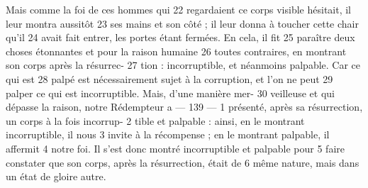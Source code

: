Mais comme la foi de ces hommes qui	 
22	 	regardaient ce corps visible hésitait, il leur montra aussitôt	 
23	 	ses mains et son côté ; il leur donna à toucher cette chair qu'il	 
24	 	avait fait entrer, les portes étant fermées. En cela, il fit	 
25	 	paraître deux choses étonnantes et pour la raison humaine	 
26	 	toutes contraires, en montrant son corps après la résurrec-	 
27	 	tion : incorruptible, et néanmoins palpable. Car ce qui est	 
28	 	palpé est nécessairement sujet à la corruption, et l'on ne peut	 
29	 	palper ce qui est incorruptible. Mais, d'une manière mer-	 
30	 	veilleuse et qui dépasse la raison, notre Rédempteur a	 
 	--- 139 ---	 
1	 	présenté, après sa résurrection, un corps à la fois incorrup-	 
2	 	tible et palpable : ainsi, en le montrant incorruptible, il nous	 
3	 	invite à la récompense ; en le montrant palpable, il affermit	 
4	 	notre foi. Il s'est donc montré incorruptible et palpable pour	 
5	 	faire constater que son corps, après la résurrection, était de	 
6	 	même nature, mais dans un état de gloire autre.